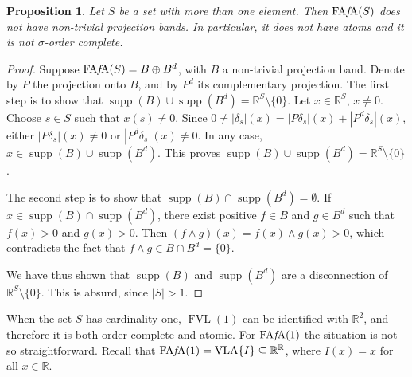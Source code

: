 \documentclass{memo-l}
\newtheorem{prop}[theorem]{Proposition}
\theoremstyle{definition}
\theoremstyle{remark}
\numberwithin{section}{chapter}
\numberwithin{equation}{chapter}
\newcommand\R{\ensuremath{\mathbb{R}}}
\newcommand{\VLA}{\operatorname{VLA}}
\newcommand{\FAFA}[1]{\operatorname{FA{\it f}\!A}(#1)}
\newcommand{\FVL}[1]{\operatorname{FVL}(#1)}
\DeclareMathOperator{\supp}{supp}
\begin{document}
\begin{prop}\label{prop:lat_prop_not_one}
    Let $S$ be a set with more than one element. Then $\FAFA S$ does
    not have non-trivial projection bands. In particular, it does not
    have atoms and it is not $\sigma $-order complete.
\end{prop}
\begin{proof}
    Suppose $\FAFA S=B\oplus B^{d}$, with $B$ a non-trivial projection
    band. Denote by $P$ the projection onto $B$, and by $P^{d}$ its
    complementary projection. The first step is to show that
    $\supp(B)\cup \supp(B^{d})=\R^{S}\setminus\{0\}$. Let $x \in
    \R^{S}$, $x\neq 0$. Choose $s \in S$ such that $x(s)\neq 0$. Since
    $0\neq |\delta _s|(x)= |P\delta _s|(x)+|P^{d}\delta _s|(x)$,
    either $|P\delta _s|(x)\neq 0$ or $|P^{d}\delta _s|(x)\neq 0$. In
    any case, $x \in \supp(B)\cup \supp(B^{d})$. This proves
    $\supp(B)\cup \supp(B^{d})=\R^{S}\setminus\{0\}$.

    The second step is to show that $\supp(B)\cap 
    \supp(B^{d})=\emptyset$. If $x \in \supp(B)\cap 
    \supp(B^{d})$, there exist positive $f \in B$ and $g \in B^{d}$
    such that $f(x)>0$ and $g(x)>0$. Then $(f\wedge g)(x)=f(x)\wedge
    g(x)>0$, which contradicts the fact that $f\wedge g\in B\cap
    B^{d}=\{0\}$.

    We have thus shown that $\supp(B)$ and $\supp(B^{d})$ are a
    disconnection of $\R^{S}\setminus\{0\}$. This is absurd, since
    $|S|>1$.
\end{proof}

When the set $S$ has cardinality one, $\FVL 1$ can be identified with
$\R^2$, and therefore it is both order complete and atomic. For $\FAFA 1$ the
situation is not so straightforward.
Recall that $\FAFA 1=\VLA\{I\}\subseteq \R^{\R}$, where $I(x)=x$ for
all $x \in \R$.
\end{document}
